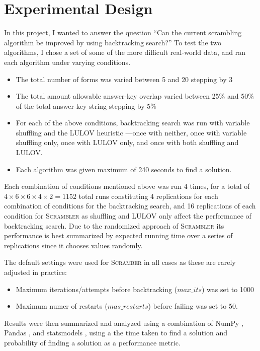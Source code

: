 \documentclass[11pt]{article}
\begin{document}
\section{Experimental Design}
\par
In this project, I wanted to answer the question ``Can the current
scrambling algorithm be improved by using backtracking search?''  To
test the two algorithms, I chose a set of some of the more difficult
real-world data, and ran each algorithm under varying conditions.
\begin{itemize}
\item The total number of forms was varied between 5 and 20 stepping
  by 3
\item The total amount allowable answer-key overlap varied between
  25\% and 50\% of the total answer-key string stepping by 5\%
\item For each of the above conditions, backtracking search was run
  with variable shuffling and the LULOV heuristic ---once with
  neither, once with variable shuffling only, once with LULOV only,
  and once with both shuffling and LULOV.
\item Each algorithm was given maximum of 240 seconds to find a
  solution.
\end{itemize}
\par
Each combination of conditions mentioned above was run 4 times, for a
total of \(4 \times 6 \times 6 \times 4 \times 2 = 1152 \)
total runs constituting 4 replications for each combination of
conditions for the backtracking search, and 16 replications of each
condition for \textsc{Scrambler} as shuffling and LULOV only affect
the performance of backtracking search. Due to the randomized approach
of \textsc{Scrambler} its performance is best summarized by expected
running time over a series of replications since it chooses values
randomly.
\par
The default settings were used for \textsc{Scramber} in all cases as
these are rarely adjusted in practice:
\begin{itemize}
\item Maximum iterations/attempts before backtracking
  (\(\mathit{max\_its}\)) was set to 1000
\item Maximum numer of restarts (\(mas\_restarts\))
  before failing was set to 50.
\end{itemize}
Results were then summarized and analyzed using a combination of NumPy
\cite{numpy}, Pandas \cite{mckinney-proc-scipy-2010w}, and statsmodels
\cite{seabold2010statsmodels}, using a the time taken to find a
solution and probability of finding a solution as a performance
metric.
\end{document}
